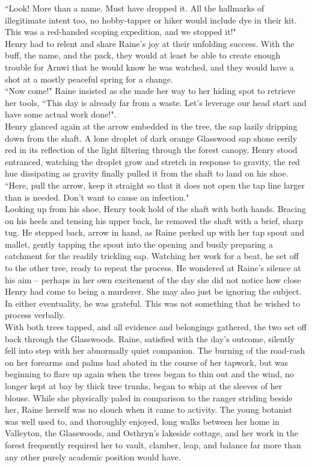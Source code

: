 ``Look! More than a name. Must have dropped it. All the hallmarks of illegitimate intent too, no hobby-tapper or hiker would include dye in their kit. This was a red-handed scoping expedition, and we stopped it!"\\
Henry had to relent and share Raine's joy at their unfolding success. 
With the buff, the name, and the pack, they would at least be able to create enough trouble for Arnwi that he would know he was watched, and they would have a shot at a mostly peaceful spring for a change.\\
``Now come!" Raine insisted as she made her way to her hiding spot to retrieve her tools, ``This day is already far from a waste. Let's leverage our head start and have some actual work done!".\\

Henry glanced again at the arrow embedded in the tree, the sap lazily dripping down from the shaft.
A lone droplet of dark orange Glasswood sap shone eerily red in its reflection of the light filtering through the forest canopy.
Henry stood entranced, watching the droplet grow and stretch in response to gravity, the red hue dissipating as gravity finally pulled it from the shaft to land on his shoe.\\

``Here, pull the arrow, keep it straight so that it does not open the tap line larger than is needed. Don't want to cause an infection."\\
Looking up from his shoe, Henry took hold of the shaft with both hands. 
Bracing on his heels and tensing his upper back, he removed the shaft with a brief, sharp tug.
He stepped back, arrow in hand, as Raine perked up with her tap spout and mallet, gently tapping the spout into the opening and busily preparing a catchment for the readily trickling sap.
Watching her work for a beat, he set off to the other tree, ready to repeat the process.
He wondered at Raine's silence at his aim -- perhaps in her own excitement of the day she did not notice how close Henry had come to being a murderer.
She may also just be ignoring the subject.
In either eventuality, he was grateful.
This was not something that he wished to process verbally.\\

With both trees tapped, and all evidence and belongings gathered, the two set off back through the Glasswoods.
Raine, satisfied with the day's outcome, silently fell into step with her abnormally quiet companion.
The burning of the road-rash on her forearms and palms had abated in the course of her tapwork, but was beginning to flare up again when the trees began to thin out and the wind, no longer kept at bay by thick tree trunks, began to whip at the sleeves of her blouse.
While she physically paled in comparison to the ranger striding beside her, Raine herself was no slouch when it came to activity.
The young botanist was well used to, and thoroughly enjoyed, long walks between her home in Valleyton, the Glasswoods, and Osthryn's lakeside cottage, and her work in the forest frequently required her to vault, clamber, leap, and balance far more than any other purely academic position would have.\\


